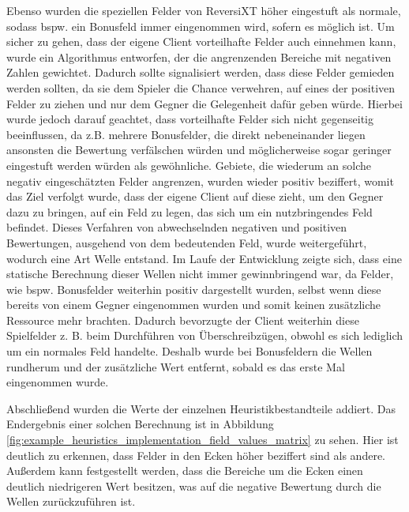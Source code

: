 \documentclass[12pt,a4paper,bibliography=totocnumbered,listof=totocnumbered]{article}
\begin{document}
Ebenso wurden die speziellen Felder von ReversiXT höher eingestuft als normale, sodass bspw. ein Bonusfeld immer eingenommen wird, sofern es möglich ist. Um sicher zu gehen, dass der eigene Client vorteilhafte Felder auch einnehmen kann, wurde ein Algorithmus entworfen, der die angrenzenden Bereiche mit negativen Zahlen gewichtet. Dadurch sollte signalisiert werden, dass diese Felder gemieden werden sollten, da sie dem Spieler die Chance verwehren, auf eines der positiven Felder zu ziehen und nur dem Gegner die Gelegenheit dafür geben würde. Hierbei wurde jedoch darauf geachtet, dass vorteilhafte Felder sich nicht gegenseitig beeinflussen, da z.B. mehrere Bonusfelder, die direkt nebeneinander liegen ansonsten die Bewertung verfälschen würden und möglicherweise sogar geringer eingestuft werden würden als gewöhnliche. Gebiete, die wiederum an solche negativ eingeschätzten Felder angrenzen, wurden wieder positiv beziffert, womit das Ziel verfolgt wurde, dass der eigene Client auf diese zieht, um den Gegner dazu zu bringen, auf ein Feld zu legen, das sich um ein nutzbringendes Feld befindet. Dieses Verfahren von abwechselnden negativen und positiven Bewertungen, ausgehend von dem bedeutenden Feld, wurde weitergeführt, wodurch eine Art Welle entstand.
Im Laufe der Entwicklung zeigte sich, dass eine statische Berechnung dieser Wellen nicht immer gewinnbringend war, da Felder, wie bspw. Bonusfelder weiterhin positiv dargestellt wurden, selbst wenn diese bereits von einem Gegner eingenommen wurden und somit keinen zusätzliche Ressource mehr brachten. Dadurch bevorzugte der Client weiterhin diese Spielfelder z. B. beim Durchführen von Überschreibzügen, obwohl es sich lediglich um ein normales Feld handelte. Deshalb wurde bei Bonusfeldern die Wellen rundherum und der zusätzliche Wert entfernt, sobald es das erste Mal eingenommen wurde.

Abschließend wurden die Werte der einzelnen Heuristikbestandteile addiert. Das Endergebnis einer solchen Berechnung ist in Abbildung \ref{fig:example_heuristics_implementation_field_values_matrix} zu sehen. Hier ist deutlich zu erkennen, dass Felder in den Ecken höher beziffert sind als andere. Außerdem kann festgestellt werden, dass die Bereiche um die Ecken einen deutlich niedrigeren Wert besitzen, was auf die negative Bewertung durch die Wellen zurückzuführen ist.
\end{document}
